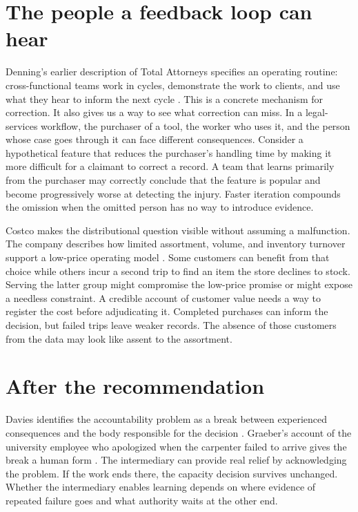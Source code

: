 \documentclass[11pt]{article}
\begin{document}
\section{The people a feedback loop can hear}
Denning's earlier description of Total Attorneys specifies an operating routine: cross-functional teams work in cycles, demonstrate the work to clients, and use what they hear to inform the next cycle \citep{denning2010radical}. This is a concrete mechanism for correction. It also gives us a way to see what correction can miss. In a legal-services workflow, the purchaser of a tool, the worker who uses it, and the person whose case goes through it can face different consequences. Consider a hypothetical feature that reduces the purchaser's handling time by making it more difficult for a claimant to correct a record. A team that learns primarily from the purchaser may correctly conclude that the feature is popular and become progressively worse at detecting the injury. Faster iteration compounds the omission when the omitted person has no way to introduce evidence.

Costco makes the distributional question visible without assuming a malfunction. The company describes how limited assortment, volume, and inventory turnover support a low-price operating model \citep{costco2025form10k}. Some customers can benefit from that choice while others incur a second trip to find an item the store declines to stock. Serving the latter group might compromise the low-price promise or might expose a needless constraint. A credible account of customer value needs a way to register the cost before adjudicating it. Completed purchases can inform the decision, but failed trips leave weaker records. The absence of those customers from the data may look like assent to the assortment.

\section{After the recommendation}
Davies identifies the accountability problem as a break between experienced consequences and the body responsible for the decision \citep{daviesTaming}. Graeber's account of the university employee who apologized when the carpenter failed to arrive gives the break a human form \citep{graeberRiseBullshitJobs}. The intermediary can provide real relief by acknowledging the problem. If the work ends there, the capacity decision survives unchanged. Whether the intermediary enables learning depends on where evidence of repeated failure goes and what authority waits at the other end.
\end{document}
